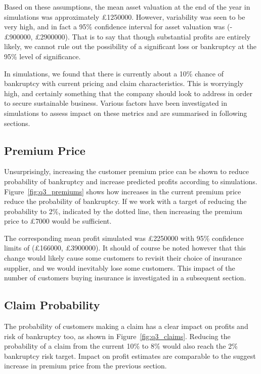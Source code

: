 \documentclass{article}
\begin{document}
Based on these assumptions, the mean asset valuation at the end of the
year in simulations was approximately \pounds{1250000}. However,
variability was seen to be very high, and in fact a 95\% confidence
interval for asset valuation was (-\pounds{900000},
\pounds{2900000}). That is to say that though substantial profits
are entirely likely, we cannot rule out the possibility of a
significant loss or bankruptcy at the 95\% level of significance.

In simulations, we found that there is currently about a 10\% chance
of bankruptcy with current pricing and claim characteristics. This is
worryingly high, and certainly something that the company should look
to address in order to secure sustainable business. Various factors
have been investigated in simulations to assess impact on these
metrics and are summarised in following sections.

\subsection*{Premium Price}

Unsurprisingly, increasing the customer premium price can be shown to
reduce probability of bankruptcy and increase predicted profits
according to simulations. Figure~\ref{fig:q3_premiums} shows how
increases in the current premium price reduce the probability of
bankruptcy. If we work with a target of reducing the probability to
2\%, indicated by the dotted line, then increasing the premium price
to \pounds{7000} would be sufficient.

The corresponding mean profit simulated was \pounds{2250000} with 95\%
confidence limits of (\pounds{166000}, \pounds{3900000}). It should of
course be noted however that this change would likely cause some
customers to revisit their choice of insurance supplier, and we would
inevitably lose some customers. This impact of the number of customers
buying insurance is investigated in a subsequent section.

\subsection*{Claim Probability}

The probability of customers making a claim has a clear impact on
profits and risk of bankruptcy too, as shown in
Figure~\ref{fig:q3_claims}. Reducing the probability of a claim from
the current 10\% to 8\% would also reach the 2\% bankruptcy risk
target. Impact on profit estimates are comparable to the suggest
increase in premium price from the previous section.
\end{document}
